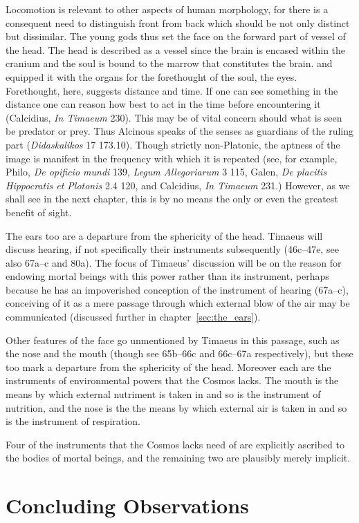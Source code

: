 Locomotion is relevant to other aspects of human morphology, for there is a consequent need to distinguish front from back which should be not only distinct but dissimilar. The young gods thus set the face on the forward part of vessel of the head. The head is described as a vessel since the brain is encased within the cranium and the soul is bound to the marrow that constitutes the brain. and equipped it with the organs for the forethought of the soul, the eyes. Forethought, here, suggests distance and time. If one can see something in the distance one can reason how best to act in the time before encountering it (Calcidius, \emph{In Timaeum} 230). This may be of vital concern should what is seen be predator or prey. Thus Alcinous speaks of the senses as guardians of the ruling part (\emph{Didaskalikos} 17 173.10). Though strictly non-Platonic, the aptness of the image is manifest in the frequency with which it is repeated (see, for example, Philo, \emph{De opificio mundi} 139, \emph{Legum Allegoriarum} 3 115, Galen, \emph{De placitis Hippocratis et Plotonis} 2.4 120, and Calcidius, \emph{In Timaeum} 231.) However, as we shall see in the next chapter, this is by no means the only or even the greatest benefit of sight. 

The ears too are a departure from the sphericity of the head. Timaeus will discuss hearing, if not specifically their instruments subsequently (46c–47e, see also 67a--c and 80a). The focus of Timaeus' discussion will be on the reason for endowing mortal beings with this power rather than its instrument, perhaps because he has an impoverished conception of the instrument of hearing (67a--c), conceiving of it as a mere passage through which external blow of the air may be communicated (discussed further in chapter~\ref{sec:the_ears}). 

Other features of the face go unmentioned by Timaeus in this passage, such as the nose and the mouth (though see 65b--66c and 66c--67a respectively), but these too mark a departure from the sphericity of the head. Moreover each are the instruments of environmental powers that the Cosmos lacks. The mouth is the means by which external nutriment is taken in and so is the instrument of nutrition, and the nose is the the means by which external air is taken in and so is the instrument of respiration. 

Four of the instruments that the Cosmos lacks need of are explicitly ascribed to the bodies of mortal beings, and the remaining two are plausibly merely implicit. 



\section{Concluding Observations} %
\label{sec:concluding_observations_incarnation}




